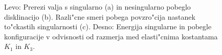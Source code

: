 \documentclass[a4paper,10pt]{article}
\begin{document}
\begin{figure}[h]
\centering
{}
\caption{Levo: Prerezi valja s singularno (a) in nesingularno pobeglo disklinacijo (b). 
Razli"cne smeri pobega povzro"cija nastanek to"ckastih singularnosti (c). Desno: Energija singularne in pobegle konfiguracije v odvisnosti od razmerja med elasti"cnima kostantama $K_1$ in $K_3$\cite{kleman}. }
 \label{fig:director-profiles}
\end{figure}
\end{document}
